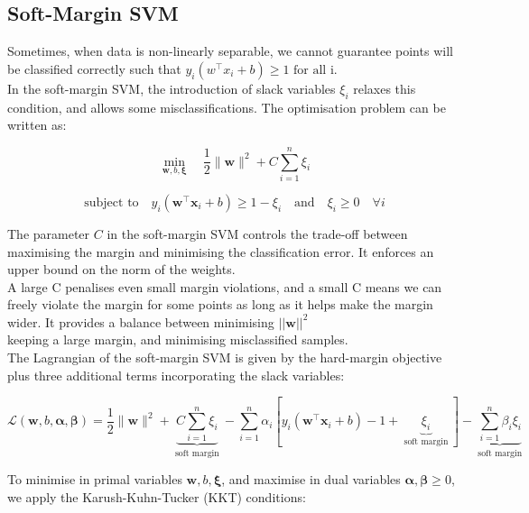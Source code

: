 \subsection{Soft-Margin SVM}

Sometimes, when data is non-linearly separable, we cannot guarantee points will be classified correctly such that $y_i(w^\top x_i+b)\geq1\text{ for all i}$. \\


In the soft-margin SVM, the introduction of slack variables \( \xi_i \) relaxes this condition, and allows some misclassifications. The optimisation problem can be written as:

\[
\min_{\mathbf{w},b,\boldsymbol{\xi}} \quad \frac{1}{2} \lVert \mathbf{w} \rVert^2 + C \sum_{i=1}^n \xi_i
\]

\[
\text{subject to} \quad y_i(\mathbf{w}^\top \mathbf{x}_i + b) \geq 1 - \xi_i \quad \text{and} \quad \xi_i \geq 0 \quad \forall i
\]

The parameter \( C \) in the soft-margin SVM controls the trade-off between maximising the margin and minimising the classification error. It enforces an upper bound on the norm of the weights.\\

A large C penalises even small margin violations, and a small C means we can freely violate the margin for some points as long as it helps make the margin wider. It provides a balance between minimising $||\textbf{w}||^2$\\ keeping a large margin, and minimising misclassified samples.\\

The Lagrangian of the soft-margin SVM is given by the hard-margin objective plus three additional terms incorporating the slack variables:

\[
\mathcal{L}(\mathbf{w}, b, \boldsymbol{\alpha}, \boldsymbol{\beta}) = \frac{1}{2} \lVert \mathbf{w} \rVert^2 +  \underbrace{C\sum_{i=1}^n \xi_i}_{\text{ soft margin }} - \sum_{i=1}^n \alpha_i [y_i(\mathbf{w}^\top \mathbf{x}_i + b) - 1 + \underbrace{\xi_i}_\text{ soft margin }] - \underbrace{\sum_{i=1}^n \beta_i \xi_i}_{\text{ soft margin }}
\]

To minimise in primal variables \( \mathbf{w}, b, \boldsymbol{\xi} \), and maximise in dual variables \( \boldsymbol{\alpha}, \boldsymbol{\beta} \geq 0 \), we apply the Karush-Kuhn-Tucker (KKT) conditions:

